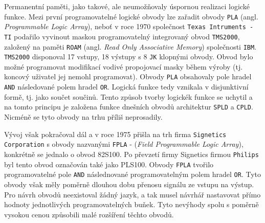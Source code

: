 {      Permanentní paměti, jako takové, ale neumožňovaly úspornou realizaci logické fun\-kce. Mezi
      první programovatelné logické obvody lze zařadit obvody \texttt{PLA} (angl.
      \emph{Programmable Logic Array}), neboť v roce 1970 společnost \texttt{Texas Intruments - TI}
      podařilo vyvinout maskou programovatelný integrovaný obvod \texttt{TMS2000}, založený na
      paměti \texttt{ROAM} (angl. \emph{Read Only Associative Memory}) společnosti \texttt{IBM}.
      \texttt{TMS2000} disponoval 17 vstupy, 18 výstupy s 8 \texttt{JK} klopnými obvody. Obvod bylo
      možné programovat modifikací vodivé propojovací masky během výroby (tj. koncový uživatel jej
      nemohl programovat). Obvody \texttt{PLA} obsahovaly pole hradel \texttt{AND} následované
      polem hradel \texttt{OR}. Logická funkce tedy vznikala v disjunktivní formě, tj. jako součet
      součinů. Tento způsob tvorby logickék funkce se uchytil a na tomto principu je založena
      funkce dnešních obvodů architektur \texttt{SPLD} a \texttt{CPLD}. Nicméně se tyto obvody na
      trhu příliš neprosadily.
      
      Vývoj však pokračoval dál a v roce 1975 přišla na trh firma \texttt{Signetics Corporation} s
      obvody nazvanými \texttt{FPLA} - (\emph{Field Programmable Logic Array}), konkrétně se
      jednalo o obvod 82S100. Po převzetí firmy Signetics firmou \texttt{Philips} byl tento obvod
      označován také jako PLS100. Obvody \texttt{FPLA} tvořilo programovatelné pole \texttt{AND}
      následnované programovatelným polem hradel \texttt{OR}. Tyto obvody však měly poměrně dlouhou
      dobu přenosu signálu ze vstupu na výstup. Pro návrh obvodů neexistoval žádný jazyk, a tak
      musel návrhář nastavovat přímo hodnoty jednotlivých programovatelných buňek. Tyto nevýhody
      spolu s poměrně vysokou cenou způsobili malé rozšíření těchto obvodů.
      
}
